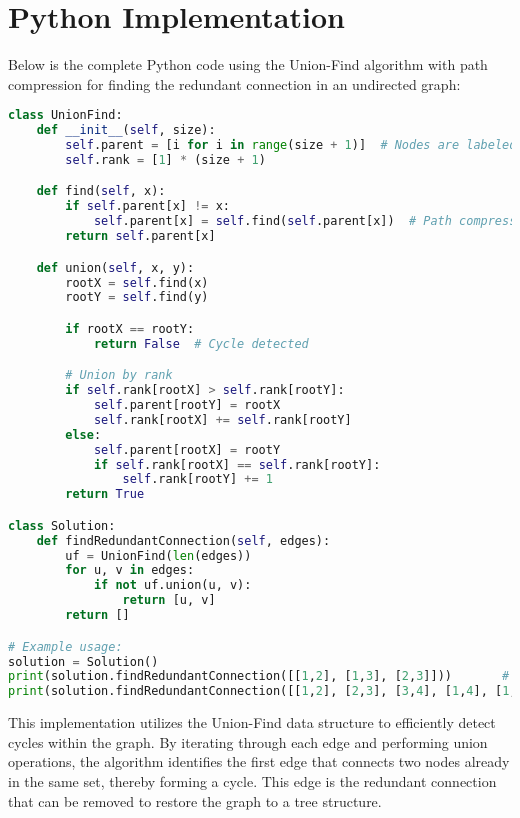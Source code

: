 \section*{Python Implementation}


Below is the complete Python code using the Union-Find algorithm with path compression for finding the redundant connection in an undirected graph:

\begin{fullwidth}
\begin{lstlisting}[language=Python]
class UnionFind:
    def __init__(self, size):
        self.parent = [i for i in range(size + 1)]  # Nodes are labeled from 1 to n
        self.rank = [1] * (size + 1)

    def find(self, x):
        if self.parent[x] != x:
            self.parent[x] = self.find(self.parent[x])  # Path compression
        return self.parent[x]

    def union(self, x, y):
        rootX = self.find(x)
        rootY = self.find(y)

        if rootX == rootY:
            return False  # Cycle detected

        # Union by rank
        if self.rank[rootX] > self.rank[rootY]:
            self.parent[rootY] = rootX
            self.rank[rootX] += self.rank[rootY]
        else:
            self.parent[rootX] = rootY
            if self.rank[rootX] == self.rank[rootY]:
                self.rank[rootY] += 1
        return True

class Solution:
    def findRedundantConnection(self, edges):
        uf = UnionFind(len(edges))
        for u, v in edges:
            if not uf.union(u, v):
                return [u, v]
        return []

# Example usage:
solution = Solution()
print(solution.findRedundantConnection([[1,2], [1,3], [2,3]]))       # Output: [2,3]
print(solution.findRedundantConnection([[1,2], [2,3], [3,4], [1,4], [1,5]]))  # Output: [1,4]
\end{lstlisting}
\end{fullwidth}

This implementation utilizes the Union-Find data structure to efficiently detect cycles within the graph. By iterating through each edge and performing union operations, the algorithm identifies the first edge that connects two nodes already in the same set, thereby forming a cycle. This edge is the redundant connection that can be removed to restore the graph to a tree structure.


